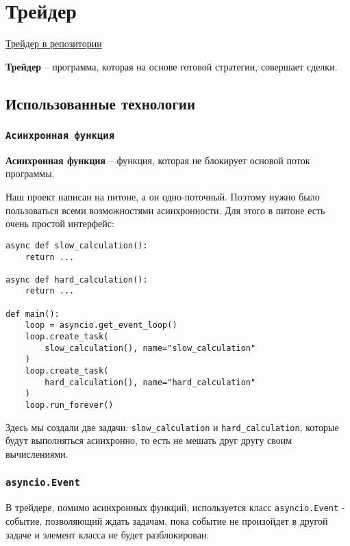 \section{Трейдер}

\href{https://github.com/dexety/dex-trading-system/blob/main/strategy/arbitrage/trader.py}{Трейдер в репозитории}

\begin{definition}
\textbf{Трейдер} -- программа, которая на основе готовой стратегии, совершает сделки.
\end{definition}

\subsection{Использованные технологии}

\subsubsection{\texttt{Асинхронная функция}}

\begin{definition}
\textbf{Асинхронная функция} -- функция, которая не блокирует основой поток программы.
\end{definition}

Наш проект написан на питоне, а он одно-поточный. Поэтому нужно было пользоваться всеми возможностями асинхронности. Для этого в питоне есть очень простой интерфейс:

\begin{verbatim}
async def slow_calculation():
    return ...
    
async def hard_calculation():
    return ...
    
def main():
    loop = asyncio.get_event_loop()
    loop.create_task(
        slow_calculation(), name="slow_calculation"
    )
    loop.create_task(
        hard_calculation(), name="hard_calculation"
    )
    loop.run_forever()
\end{verbatim}

Здесь мы создали две задачи: \texttt{slow\_calculation} и  \texttt{hard\_calculation}, которые будут выполняться асинхронно, то есть не мешать друг другу своим вычислениями.

\subsubsection{\texttt{asyncio.Event}}

В трейдере, помимо асинхронных функций, используется класс \texttt{asyncio.Event} - событие, позволяющий ждать задачам, пока событие не произойдет в другой задаче и элемент класса не будет разблокирован.

